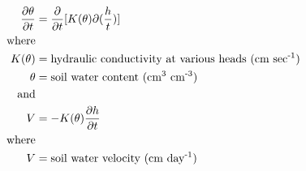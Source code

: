 \documentclass[fleqn, oneside, 11pt]{article}%
\begin{document}
\begin{preview}
\begin{align*}%
\frac{\partial \theta}{\partial t} & = \frac{\partial}{\partial t} [K(\theta) \partial (\frac{h}{t})] \\ 
\text{where} \nonumber \\
K(\theta) & =  \text{hydraulic conductivity at various heads (cm sec\textsuperscript{-1})} \nonumber \\
\theta & = \text{soil water content (cm\textsuperscript{3} cm\textsuperscript{-3})} \nonumber \\
\text{and} \nonumber \\
V & = -K(\theta) \frac{\partial h}{\partial t} \nonumber \\
\text{where} \nonumber \\
V & = \text{soil water velocity (cm day\textsuperscript{-1})} \nonumber \\
\end{align*} 
\end{preview}
\end{document}
